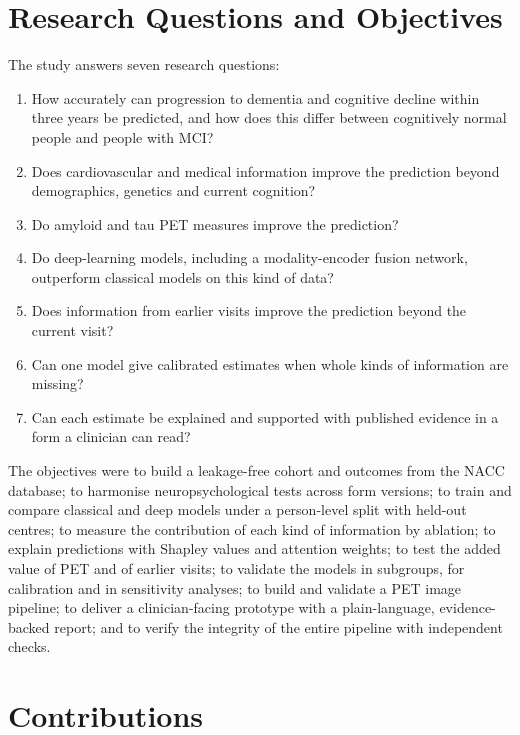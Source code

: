 \section{Research Questions and Objectives}

The study answers seven research questions:
\begin{enumerate}[label=\textbf{RQ\arabic*.},leftmargin=*]
\item How accurately can progression to dementia and cognitive decline within three years be predicted, and how does this differ between cognitively normal people and people with MCI?
\item Does cardiovascular and medical information improve the prediction beyond demographics, genetics and current cognition?
\item Do amyloid and tau PET measures improve the prediction?
\item Do deep-learning models, including a modality-encoder fusion network, outperform classical models on this kind of data?
\item Does information from earlier visits improve the prediction beyond the current visit?
\item Can one model give calibrated estimates when whole kinds of information are missing?
\item Can each estimate be explained and supported with published evidence in a form a clinician can read?
\end{enumerate}

The objectives were to build a leakage-free cohort and outcomes from the NACC database; to harmonise neuropsychological tests across form versions; to train and compare classical and deep models under a person-level split with held-out centres; to measure the contribution of each kind of information by ablation; to explain predictions with Shapley values and attention weights; to test the added value of PET and of earlier visits; to validate the models in subgroups, for calibration and in sensitivity analyses; to build and validate a PET image pipeline; to deliver a clinician-facing prototype with a plain-language, evidence-backed report; and to verify the integrity of the entire pipeline with independent checks.

\section{Contributions}

